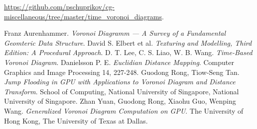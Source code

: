 \documentclass[12pt]{article}
\begin{document}
\url{https://github.com/pschuprikov/cg-miscellaneous/tree/master/time_voronoi_diagrams}.

\begin{thebibliography}{10}
 Franz Aurenhammer. \textit{Voronoi Diagramm --- A Survey of a Fundamental Geomteric Data Structure}.
 David S. Elbert et al. \textit{Texturing and Modelling, Third Edition: A Procedural Approach}.
 D. T. Lee, C. S. Liao, W. B. Wang. \textit{Time-Based Voronoi Diagram}.
 Danielsson P. E. \textit{Euclidian Distance Mapping}. Computer Graphics and Image Processing 14, 227-248.
 Guodong Rong, Tiow-Seng Tan. \textit{Jump Flooding in GPU with Applications to Voronoi Diagram and Distance Transform}. School of Computing, National University of Singapore, National University of Singapore. 
 Zhan Yuan, Guodong Rong, Xiaohu Guo, Wenping Wang. \textit{Generalized Voronoi Diagram Computation on GPU}. The University of Hong Kong, The University of Texas at Dallas.
\end{thebibliography}
\end{document}
